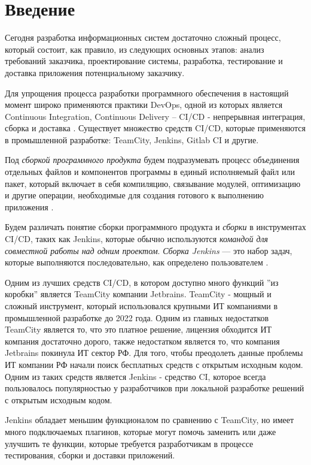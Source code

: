 \chapter*{Введение} %

Сегодня разработка информационных систем достаточно сложный процесс, который состоит, как правило, из следующих основных этапов: анализ требований заказчика, проектирование системы, разработка, тестирование и доставка приложения потенциальному заказчику. 

Для упрощения процесса разработки программного обеспечения в настоящий момент широко применяются практики DevOps, одной из которых является Continuous Integration, Continuous Delivery -- CI/CD - непрерывная интеграция, сборка и доставка \cite{cidef}. Существует множество средств CI/CD, которые применяются в промышленной разработке: TeamCity, Jenkins, Gitlab CI и другие.

Под \textit{сборкой программного продукта} будем подразумевать процесс объединения отдельных файлов и компонентов программы в единый исполняемый файл или пакет, который включает в себя компиляцию, связывание модулей, оптимизацию и другие операции, необходимые для создания готового к выполнению приложения \cite{build}.

Будем различать понятие сборки программного продукта и \textit{сборки} в инструментах CI/CD, таких как Jenkins, которые обычно используются \textit{командой для совместной работы над одним проектом}. \textit{Сборка Jenkins} — это набор задач, которые выполняются последовательно, как определено пользователем \cite{jenkinsjob}.

Одним из лучших средств CI/CD, в котором доступно много функций ''из коробки'' является TeamCity компании Jetbrains. TeamCity - мощный и сложный инструмент, который использовался крупными ИТ компаниями в промышленной разработке до 2022 года. Одним из главных недостатков TeamCity является то, что это платное решение, лицензия обходится ИТ компания достаточно дорого, также недостатком является то, что компания Jetbrains покинула ИТ сектор РФ. Для того, чтобы преодолеть данные проблемы ИТ компании РФ начали поиск бесплатных средств с открытым исходным кодом. Одним из таких средств является Jenkins - средство CI, которое всегда пользовалось популярностью у разработчиков при локальной разработке решений с открытым исходным кодом. 

Jenkins обладает меньшим функционалом по сравнению с TeamCity, но имеет много подключаемых плагинов, которые могут помочь заменить или даже улучшить те функции, которые требуется разработчикам в процессе тестирования, сборки и доставки приложений.

